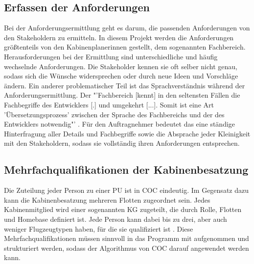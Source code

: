 \documentclass [12pt, a4paper, oneside, titlepage, ngerman]{article}
\begin{document}
\subsection{Erfassen der Anforderungen} 
Bei der Anforderungsermittlung geht es darum, die passenden Anforderungen von den Stakeholdern zu ermitteln. In diesem Projekt werden die Anforderungen größtenteils von den Kabinenplanerinnen gestellt, dem sogenannten Fachbereich. \\
Herausforderungen bei der Ermittlung sind unterschiedliche und häufig wechselnde Anforderungen. Die Stakeholder kennen sie oft selber nicht genau, sodass sich die Wünsche widersprechen oder durch neue Ideen und Vorschläge ändern.%
Ein anderer problematischer Teil ist das Sprachverständnis während der Anforderungsermittlung. Der "'Fachbereich [kennt] in den seltensten Fällen die Fachbegriffe des Entwicklers [.] und umgekehrt [...]. Somit ist eine Art 'Übersetzungsprozess' zwischen der Sprache des Fachbereichs und der des Entwicklers notwendig"' \cite[S.319]{Alpar2016} . 
Für den Auftragnehmer bedeutet das eine ständige Hinterfragung aller Details und Fachbegriffe sowie die Absprache jeder Kleinigkeit mit den Stakeholdern, sodass sie vollständig ihren Anforderungen entsprechen. \\



\subsection{Mehrfachqualifikationen der Kabinenbesatzung}
Die Zuteilung jeder Person zu einer \ac{PU} ist in \ac{COC} eindeutig.
Im Gegensatz dazu kann die Kabinenbesatzung mehreren Flotten zugeordnet sein. Jedes Kabinenmitglied wird einer sogenannten \ac{KG} zugeteilt, die durch Rolle, Flotten und Homebase definiert ist. Jede Person kann dabei bis zu drei, aber auch weniger Flugzeugtypen haben, für die sie qualifiziert ist \cite[vgl.][]{Gespraech2}. Diese Mehrfachqualifikationen müssen sinnvoll in das Programm mit aufgenommen und strukturiert werden, sodass der Algorithmus von \ac{COC} darauf angewendet werden kann.

\end{document}
